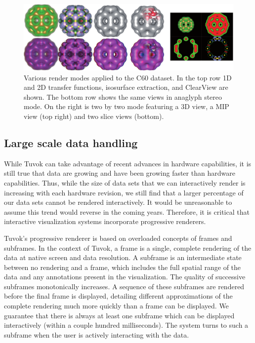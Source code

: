\begin{figure}
	\includegraphics[width=\linewidth]{images/arch/c60modes}

  \caption{Various render modes applied to the C60 dataset.  In the
  top row 1D and 2D transfer functions, isosurface extraction, and
  ClearView are shown.  The bottom row shows the same views in anaglyph
  stereo mode.  On the right is two by two mode featuring a 3D view, a
  MIP view (top right) and two slice views (bottom).}
	\label{fig:modes}

\end{figure}

\subsection{Large scale data handling}

While Tuvok can take advantage of recent advances in hardware
capabilities, it is still true that data are growing and
have been growing faster than hardware capabilities. Thus, while
the size of data sets that we can interactively render is
increasing with each hardware revision, we still find that a
larger percentage of our data sets cannot be rendered interactively.
It would be unreasonable to assume this trend would
reverse in the coming years. Therefore, it is critical that
interactive visualization systems incorporate progressive
renderers.

Tuvok's progressive renderer is based on overloaded
concepts of frames and subframes. In the context of Tuvok, a
frame is a single, complete rendering of the data at native
screen and data resolution. A subframe is an intermediate
state between no rendering and a frame, which includes the
full spatial range of the data and any annotations present in
the visualization. The quality of successive subframes
monotonically increases. A sequence of these subframes are
rendered before the final frame is displayed, detailing different
approximations of the complete rendering much more
quickly than a frame can be displayed. We guarantee that
there is always at least one subframe which can be displayed
interactively (within a couple hundred milliseconds). The
system turns to such a subframe when the user is actively
interacting with the data.

